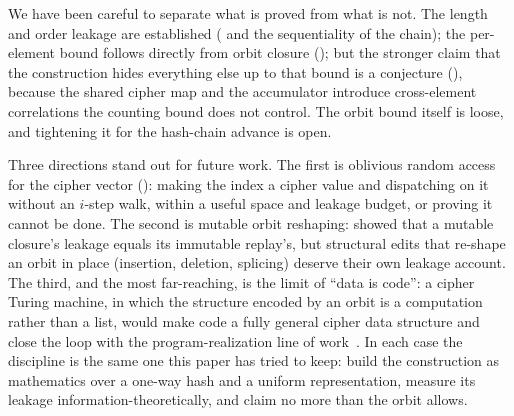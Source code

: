 \documentclass[11pt]{article}
\theoremstyle{definition}
\theoremstyle{plain}
\theoremstyle{definition}
\theoremstyle{remark}
\begin{document}
We have been careful to separate what is proved from what is not. The
length and order leakage are established ( and
the sequentiality of the chain); the per-element bound follows directly
from orbit closure (); but the stronger claim
that the construction hides everything else up to that bound is a
conjecture (), because the shared cipher map and the
accumulator introduce cross-element correlations the counting bound
does not control. The orbit bound itself is loose, and tightening it
for the hash-chain advance is open.

Three directions stand out for future work. The first is oblivious
random access for the cipher vector (): making
the index a cipher value and dispatching on it without an $i$-step walk,
within a useful space and leakage budget, or proving it cannot be done.
The second is mutable orbit reshaping:  showed that a
mutable closure's leakage equals its immutable replay's, but structural
edits that re-shape an orbit in place (insertion, deletion, splicing)
deserve their own leakage account. The third, and the most
far-reaching, is the limit of \enquote{data is code}: a cipher Turing
machine, in which the structure encoded by an orbit is a computation
rather than a list, would make code a fully general cipher data
structure and close the loop with the program-realization line of
work~\cite{towell2026cipherprog}. In each case the discipline is the
same one this paper has tried to keep: build the construction as
mathematics over a one-way hash and a uniform representation, measure
its leakage information-theoretically, and claim no more than the orbit
allows.



\end{document}
